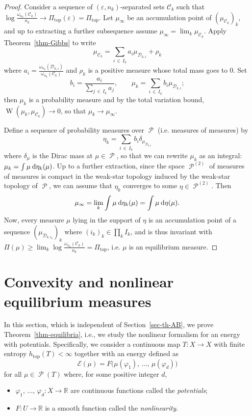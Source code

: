 \documentclass[10pt]{amsart}
\theoremstyle{definition}\newtheorem{defi}[theo]{Definition}\newtheorem{rema}[theo]{Remark}\newtheorem{exam}[theo]{Example}\newtheorem{exem}[theo]{Example}\newtheorem{nota}[theo]{Notation}
\theoremstyle{plain}
\theoremstyle{plain}
\newcommand\NLP{\Pi}
\renewcommand\top{{\mathrm{top}}}
\newcommand{\wass}{\operatorname{W}}
\newcommand\Prob{{\operatorname{\mathscr{P}}}}
\newcommand*{\dd} {\relax\ifnum\lastnodetype>0\mskip\medmuskip\fi\mathrm{d}}
\newcommand{\pot}{\varphi}
\newcounter{In}
\newcommand*\8{\infty}
\newcommand\RR{\mathbb{R}}
\newcommand{\En}{\mathcal{E}}
\newcommand{\cD}{\mathcal{D}}
\newcommand{\cC}{\mathcal C}
\begin{document}
\begin{proof}
Consider a sequence of $(\varepsilon,n_k)$-separated sets $\cC_k$ such that $\log\frac{\omega_{n_k}(\cC_k)}{n_k} \to \NLP_\top(\varepsilon) = \NLP_\top$. Let $\mu_\infty$ be an accumulation point of $(\mu_{\cC_k})_k$, and up to extracting a further subsequence assume $\mu_\infty = \lim_k \mu_{\cC_k}$. Apply Theorem~\ref{thm-Gibbs} to write
\[
\mu_{\cC_k} = \sum_{i\,\in\,I_k} a_i \mu_{\cD_{k,i}} + \rho_k
\]
where $a_i = \frac{\omega_{n_k}(\cD_{k,i})}{\omega_{n_k}(\cC_k)}$ and $\rho_k$ is a positive measure whose total mass goes to $0$. Set
\[
b_i=\frac{a_i}{\sum_{j\,\in\,I_k} a_j}, \qquad \mu_k= \sum_{i\,\in\,I_k} b_i \mu_{\cD_{k,i}};
\]
then $\mu_k$ is a probability measure and by the total variation bound, $\wass(\mu_k,\mu_{\cC_k})\to0$, so that $\mu_k\to\mu_\infty$.

Define a sequence of probability measures over $\Prob$ (i.e. measures of measures) by
\[
\eta_k=\sum_{i\,\in\,I_k} b_i \delta_{\mu_{\cD_{k,i}}}
\]
where $\delta_\mu$ is the Dirac mass at $\mu\in\Prob$, so that we can rewrite $\mu_k$ as an integral: $\mu_k=\int \mu\dd\eta_k(\mu)$. Up to a further extraction, since the space $\Prob^{(2)}$ of measures of measures is compact in the weak-star topology induced by the weak-star topology of $\Prob$, we can assume that $\eta_k$ converges to some $\eta\in \Prob^{(2)}$. Then
\[
\mu_\infty = \lim_k \int \mu \dd\eta_k(\mu) = \int \mu \dd\eta(\mu).
\]
Now, every measure $\mu$ lying in the support of $\eta$ is an accumulation point of a sequence $(\mu_{\cD_{k,i_k}})_k$ where $(i_k)_k\in\prod_k I_k$, and is thus invariant with $\NLP(\mu) \ge \lim_k \log\frac{\omega_{n_k}(\cC_k)}{n_k} = \NLP_\top$, i.e. $\mu$ is an equilibrium measure.
\end{proof}



\section{Convexity and nonlinear equilibrium measures}\label{sec:convexity}

In this section, which is independent of Section~\ref{sec-th-AB}, we prove Theorem~\ref{thm-equilibria}, i.e., we study the nonlinear formalism for an energy with potentials. Specifically, we consider a continuous map $T:X\to X$ with finite entropy $h_\top(T)<\infty$ together with an energy defined as
\[
\En(\mu) = F\big(\mu(\pot_1),\,\dots,\,\mu(\pot_d)\big)
\]
for all $\mu\in\Prob(T)$ where, for some positive integer $d$,
\begin{itemize}
\item $\pot_1,\,\dots,\,\pot_d:X\to\RR$ are continuous functions called the \emph{potentials};
\item $F:U\to\RR$ is a smooth function called the \emph{nonlinearity}.
\end{itemize}
\end{document}
